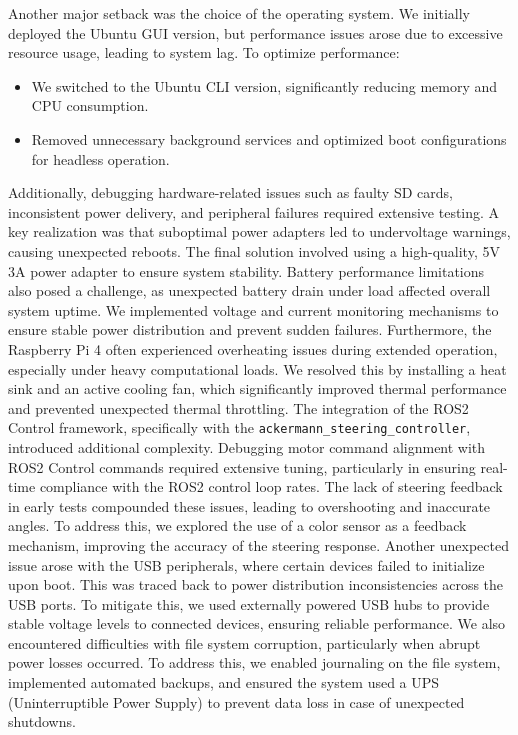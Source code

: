 \documentclass[english,project]{buwthesis}
\begin{document}
Another major setback was the choice of the operating system. We initially deployed the Ubuntu GUI version, but performance issues arose due to excessive resource usage, leading to system lag. To optimize performance:
\begin{itemize}
\item We switched to the Ubuntu CLI version, significantly reducing memory and CPU consumption.
\item Removed unnecessary background services and optimized boot configurations for headless operation.
\end{itemize}

Additionally, debugging hardware-related issues such as faulty SD cards, inconsistent power delivery, and peripheral failures required extensive testing. A key realization was that suboptimal power adapters led to undervoltage warnings, causing unexpected reboots. The final solution involved using a high-quality, 5V 3A power adapter to ensure system stability. Battery performance limitations also posed a challenge, as unexpected battery drain under load affected overall system uptime. We implemented voltage and current monitoring mechanisms to ensure stable power distribution and prevent sudden failures.
\sloppy
Furthermore, the Raspberry Pi 4 often experienced overheating issues
during extended operation, especially under heavy computational loads. 
We resolved this by installing a heat sink and an active cooling fan, which significantly improved thermal performance and prevented unexpected
thermal throttling. The integration of the ROS2 Control framework, 
specifically with the \texttt{ackermann\_steering\_controller}, introduced
additional complexity. Debugging motor command alignment with ROS2 Control 
commands required extensive tuning, particularly in ensuring real-time compliance with the ROS2 control loop rates. The lack of steering feedback
in early tests compounded these issues, leading to overshooting and
inaccurate angles. To address this, we explored the use of a color sensor
as a feedback mechanism, improving the accuracy of the steering response.
\sloppy
Another unexpected issue arose with the USB peripherals, where certain devices failed to initialize upon boot. This was traced back to power distribution inconsistencies across the USB ports. To mitigate this, we used externally powered USB hubs to provide stable voltage levels to connected devices, ensuring reliable performance. We also encountered difficulties with file system corruption, particularly when abrupt power losses occurred. To address this, we enabled journaling on the file system, implemented automated backups, and ensured the system used a UPS (Uninterruptible Power Supply) to prevent data loss in case of unexpected shutdowns.
\end{document}
